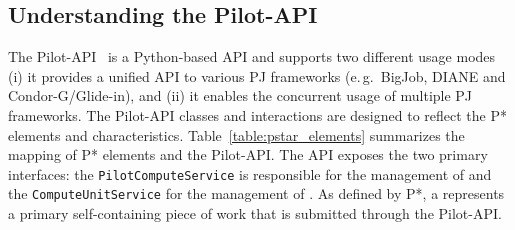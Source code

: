 \documentclass[conference]{IEEEtran}
\begin{document}


\upp
\subsection{Understanding the Pilot-API}


The Pilot-API~\cite{pilot_api} is a Python-based API and supports two different 
usage modes (i) it provides a unified API to various PJ frameworks (e.\,g.\ 
BigJob, DIANE and Condor-G/Glide-in), and (ii) it enables the concurrent usage 
of multiple PJ frameworks. The Pilot-API classes and interactions are designed 
to reflect the P* elements and characteristics. 
Table~\ref{table:pstar_elements} summarizes the mapping of P* elements and the 
Pilot-API. The API exposes the two primary interfaces: the 
\texttt{Pilot\-Compute\-Service} is responsible for the management of \pilots 
and the \texttt{Compute\-Unit\-Service} for the management of \cus. As defined 
by P*, a \cu represents a primary self-containing piece of work that is 
submitted through the Pilot-API.



\end{document}
